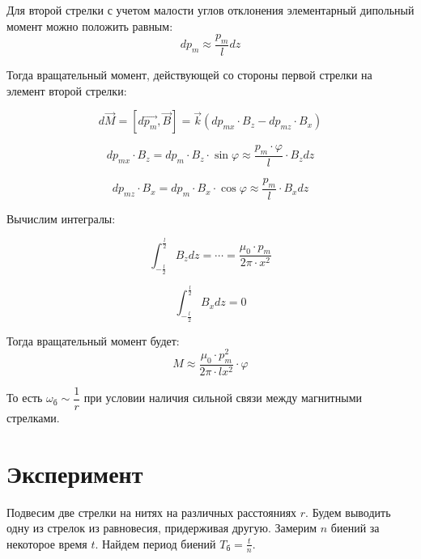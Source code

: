 \documentclass{letask}
\begin{document}
Для второй стрелки с учетом малости углов отклонения элементарный дипольный момент можно положить равным:
$$dp_m \approx \dfrac{p_m}{l} dz$$

Тогда вращательный момент, действующей со стороны первой стрелки на элемент второй стрелки:

\begin{equation}
d \vec{M} = \left[ d \vec{p_m} , \vec{B}  \right] = \vec{k} (dp_{mx} \cdot B_z - dp_{mz} \cdot B_x)
\end{equation}

$$dp_{mx} \cdot B_z = dp_m \cdot B_z \cdot \sin \varphi \approx \dfrac{p_m \cdot \varphi}{l} \cdot B_z dz$$

$$dp_{mz} \cdot B_x = dp_m \cdot B_x \cdot \cos \varphi \approx \dfrac{p_m}{l} \cdot B_x dz$$

Вычислим интегралы:

\begin{equation}
\int_{-\frac{l}{2}}^{\frac{l}{2}} B_z dz = \cdots = \dfrac{\mu_0 \cdot p_m}{2 \pi \cdot x^2}
\end{equation}

\begin{equation}
\int_{-\frac{l}{2}}^{\frac{l}{2}} B_x dz = 0
\end{equation}

Тогда вращательный момент будет:
\begin{equation}
M \approx \dfrac{\mu_0 \cdot p_m^2}{2 \pi \cdot lx^2} \cdot \varphi
\end{equation}

То есть $\omega_\text{б} \sim \dfrac{1}{r}$ при условии наличия сильной связи между магнитными стрелками.


\section{Эксперимент}
Подвесим две стрелки на нитях на различных расстояниях $r$. Будем выводить одну из стрелок из равновесия, придерживая другую. Замерим $n$ биений за некоторое время $t$. Найдем период биений $T_\text{б} = \frac{t}{n}$.
\end{document}
